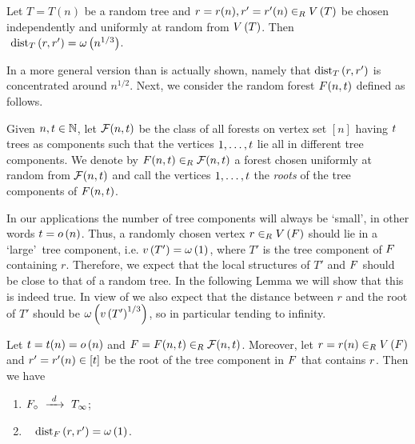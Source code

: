 \begin{thm}\label{LSthm:limit_tree2}
Let $T=T(n)$ be a random tree and $r=r(n), r'=r'(n)\in_RV\left(T\right)$ be chosen independently and uniformly at random from $V\left(T\right)$. Then \whp\ $~\operatorname{dist}_{T}\left(r, r'\right)=\omega\left(n^{1/3}\right)$.
\end{thm}
In \cite{MeirMoon1970} a more general version than  is actually shown, namely that $\operatorname{dist}_{T}\left(r, r'\right)$ is concentrated around $n^{1/2}$. Next, we consider the random forest $F(n,t)$ defined as follows.
\begin{definition}\label{LSdef:random_forest}
	Given $n, t\in\mathbb{N}$, let $\mathcal{F}(n,t)$ be the class of all forests on vertex set $[n]$ having $t$ trees as components such that the vertices $1, \ldots, t$ lie all in different tree components. We denote by $F(n,t)\in_R\mathcal{F}(n,t)$ a forest chosen uniformly at random from $\mathcal{F}(n,t)$ and call the vertices $1, \ldots, t$ the {\em roots} of the tree components of $F(n,t)$.
\end{definition}
In our applications the number of tree components will always be \lq small\rq, in other words $t=o\left(n\right)$. Thus, a randomly chosen vertex $r\in_RV\left(F\right)$ should lie in a \lq large\rq\ tree component, i.e. $v\left({T'}\right)=\omega\left(1\right)$, where $T'$ is the tree component of $F$ containing $r$. Therefore, we expect that the local structures of $T'$ and $F$ should be close to that of a random tree. In the following Lemma we will show that this is indeed true. In view of  we also expect that the distance between $r$ and the root of $T'$ should be $\omega\left(v\left({T'}\right)^{1/3}\right)$, so in particular tending to infinity.
\begin{lem}\label{LSlem:limit_forest}
Let $t=t(n)=o\left(n\right)$ and $F=F(n,t)\in_R\mathcal{F}(n,t)$. Moreover, let $r=r(n)\in_RV\left(F\right)$ and $r'=r'(n)\in[t]$ be the root of the tree component in $F$ that contains $r$. Then we have
\begin{enumerate}[label=\normalfont(\roman*)]
\item\label{LSlem:limit_forest1}
$F_\circ~\xrightarrow{~d~}~T_\infty$;
\item\label{LSlem:limit_forest2}
\whp\ $~\operatorname{dist}_{F}\left(r, r'\right)=\omega\left(1\right)$.
\end{enumerate}
\end{lem}
